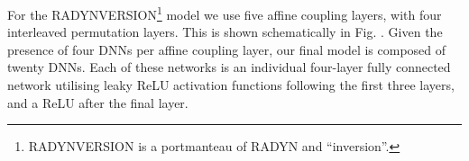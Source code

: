 For the RADYNVERSION\footnote{RADYNVERSION is a portmanteau of RADYN and ``inversion''.} model we use five affine coupling layers, with four interleaved permutation layers.
This is shown schematically in Fig. \NeedRef{}.
Given the presence of four DNNs per affine coupling layer, our final model is composed of twenty DNNs.
Each of these networks is an individual four-layer fully connected network utilising leaky ReLU activation functions following the first three layers, and a ReLU after the final layer.
